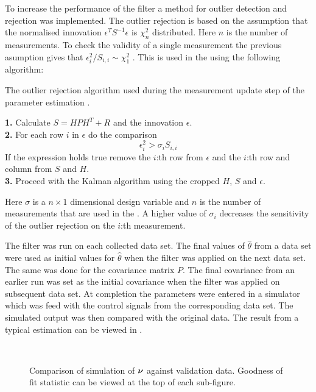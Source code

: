 To increase the performance of the filter a method for outlier detection and rejection was implemented.
The outlier rejection is based on the assumption that the normalised innovation $\epsilon^T S^{-1} \epsilon$ is $\chi_{n}^{2}$ distributed. Here $n$ is the number of measurements. To check the validity of a single measurement the previous asumption gives that $\epsilon_i^{2}/S_{i,i} \sim \chi_{1}^{2}$ \citep{sensorfusion}. This is used in the \abbrEKF using the following algorithm:
\begin{algorithm}[H]
\label{alg:outlier}
\caption{The outlier rejection algorithm used during the measurement update step of the parameter estimation \abbrEKF.}
\textbf{1.} Calculate $S=H P H^T + R$ and the innovation $\epsilon$.
\\
\textbf{2.} For each row $i$ in $\epsilon$ do the comparison
\begin{equation}
\epsilon_{i}^{2} > \sigma_i S_{i,i}
\end{equation}
If the expression holds true remove the $i$:th row from $\epsilon$ and the $i$:th row and column from $S$ and $H$.\\
\textbf{3.} Proceed with the Kalman algorithm using the cropped $H$, $S$ and $\epsilon$.
\end{algorithm}
Here $\sigma$ is a $n\times1$ dimensional design variable and $n$ is the number of measurements that are used in the \abbrEKF. A higher value of $\sigma_i$ decreases the sensitivity of the outlier rejection on the $i$:th measurement.

The filter was run on each collected data set. The final values of $\hat{\theta}$ from a data set were used as initial values for $\hat{\theta}$ when the filter was applied on the next data set. The same was done for the covariance matrix $P$. The final covariance from an earlier run was set as the initial covariance when the filter was applied on subsequent data set. At completion the parameters were entered in a simulator which was feed with the control signals from the corresponding data set. The simulated  output was then compared with the original data. The result from a typical estimation can be viewed in .
\begin{figure}[tbp]
  \centering
  \qquad
  \\
  \caption{\label{fig:KalmanCompare}%
    Comparison of simulation of $\boldsymbol{\nu}$ against validation data. Goodness of fit statistic can be viewed at the top of each sub-figure.}
\end{figure}



